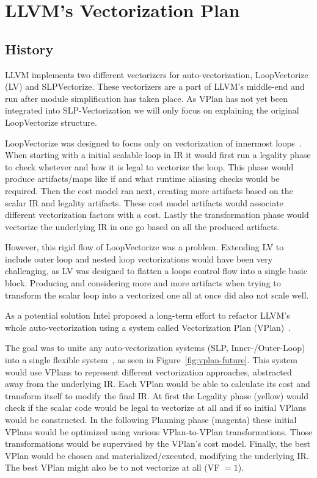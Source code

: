 \documentclass[sigplan,11pt,nonacm]{acmart}
\begin{document}
\section{LLVM's Vectorization Plan}
\label{sec:vplan}

\subsection{History}
LLVM implements two different vectorizers for auto-vectorization, LoopVectorize (LV)
and SLPVectorize. These vectorizers are a part of LLVM's middle-end and run after module 
simplification has taken place. As VPlan has not yet been integrated into SLP-Vectorization 
we will only focus on explaining the original LoopVectorize structure.

LoopVectorize was designed to focus only on vectorization of innermost loops~\cite{llvmintrvplan}. 
When starting with a initial scalable loop in IR it would first run a legality phase to check 
whetever and how it is legal to vectorize the loop. This phase would produce artifacts/maps like if 
and what runtime aliasing checks would be required. Then the cost model ran next, creating more 
artifacts based on the scalar IR and legality artifacts. These cost model artifacts would 
associate different vectorization factors with a cost. Lastly the transformation phase would 
vectorize the underlying IR in one go based on all the produced artifacts.

However, this rigid flow of LoopVectorize was a problem. Extending LV to include outer loop 
and nested loop vectorizations would have been very challenging, as LV was designed to flatten a
loops control flow into a single basic block. Producing and considering more and 
more artifacts when trying to transform the scalar loop into a vectorized one all at once did also 
not scale well.

As a potential solution Intel proposed a long-term effort to refactor LLVM's whole auto-vectorization
using a system called Vectorization Plan (VPlan)~\cite{llvmextloopvec}.

The goal was to unite any auto-vectorization systems (SLP, Inner-/Outer-Loop) into a single flexible
system~\cite{llvmintrvplan,llvmvplanstate}, as seen in Figure~\ref{fig:vplan-future}. This system would use VPlans to represent different 
vectorization approaches, abstracted away from the underlying IR. Each VPlan would be able to 
calculate its cost and transform itself to modify the final IR. At first the Legality 
phase (yellow) would check if the scalar code would be legal to vectorize at all and if so initial 
VPlans would be constructed. In the following Planning phase (magenta) these initial VPlans would 
be optimized using various VPlan-to-VPlan transformations. Those transformations would be supervised 
by the VPlan's cost model. Finally, the best VPlan would be chosen and materialized/executed, 
modifying the underlying IR. The best VPlan might also be to not vectorize at all (VF $=1$).
\end{document}
